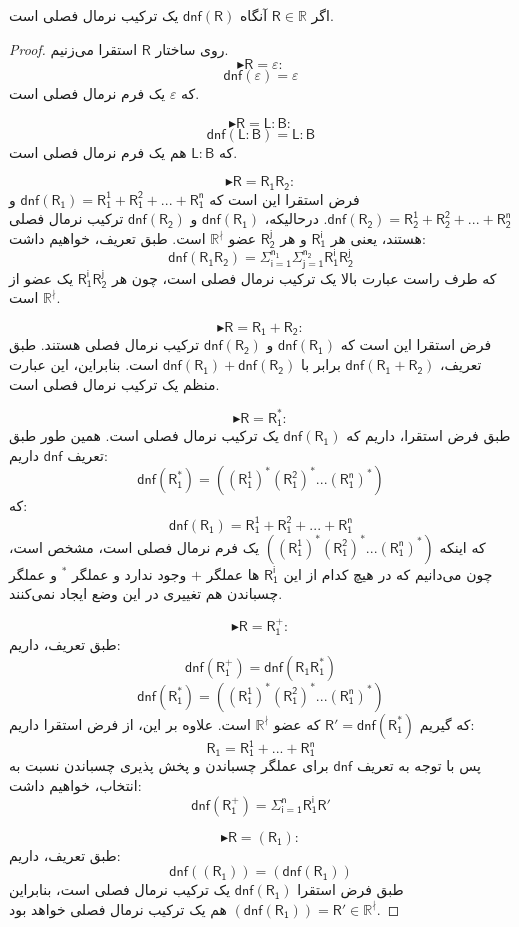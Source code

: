 \begin{thm}
	اگر $\mathsf{R} \in \mathbb{R}$ آنگاه $\mathsf{dnf(R)}$ یک ترکیب نرمال فصلی است.
\end{thm}
\begin{proof}
روی ساختار $\mathsf{R}$ استقرا می‌زنیم.
$$\blacktriangleright \mathsf{R}=\varepsilon:$$
$$\mathsf{dnf(\varepsilon)}=\varepsilon$$
که $\varepsilon$ یک فرم نرمال فصلی است.


$$\blacktriangleright \mathsf{R=L:B}:$$
$$\mathsf{dnf(\mathsf{L:B})}=\mathsf{L:B}$$
که $\mathsf{L:B}$ هم یک فرم نرمال فصلی است.


$$\blacktriangleright \mathsf{R=R_1R_2}:$$
فرض استقرا این است که 
$\mathsf{dnf(R_1)=R_1^1+R_1^2+...+R_1^n}$
و
$\mathsf{dnf(R_2)=R_2^1+R_2^2+...+R_2^n}$.
درحالیکه، $\mathsf{dnf(R_1)}$ و $\mathsf{dnf(R_2)}$ ترکیب نرمال فصلی هستند، یعنی هر $\mathsf{R_1^i}$ و هر $\mathsf{R_2^j}$ عضو $\mathbb{R^{\nmid}}$ است.
طبق تعریف، خواهیم داشت:
$$\mathsf{dnf}(\mathsf{R_1 R_2})=\mathsf{\Sigma_{i=1}^{n_1}\Sigma_{j=1}^{n_2} R_1^i R_2^j}$$
که طرف راست عبارت بالا یک ترکیب نرمال فصلی است، چون هر  
$\mathsf{R_1^i R_2^j}$
یک عضو از $\mathbb{R}^\nmid$ است.

$$\blacktriangleright \mathsf{R=R_1+R_2}:$$
فرض استقرا این است که $\mathsf{dnf(R_1)}$ و $\mathsf{dnf(R_2)}$ ترکیب نرمال فصلی هستند. طبق تعریف،
$\mathsf{dnf(R_1+R_2)}$
برابر با
$\mathsf{dnf(R_1)+dnf(R_2)}$
است. بنابراین، این عبارت منظم یک ترکیب نرمال فصلی است.

$$\blacktriangleright \mathsf{R=R_1^*}:$$
طبق فرض استقرا، داریم که $\mathsf{dnf(R_1)}$ یک ترکیب نرمال فصلی است. همین طور طبق تعریف $\mathsf{dnf}$ داریم:
$$\mathsf{dnf(R_1^*)= ((R_1^1)^* (R_1^2)^* ... (R_1^n)^*)}$$
که:
$$\mathsf{dnf(R_1)=R_1^1+R_1^2+...+R_1^n}$$
که اینکه $\mathsf{((R_1^1)^* (R_1^2)^* ... (R_1^n)^*)}$ یک فرم نرمال فصلی است، مشخص است، چون می‌دانیم که در هیچ کدام از این $\mathsf{R_1^i}$ ها عملگر $+$ وجود ندارد و عملگر $ ^*$ و عملگر چسباندن هم تغییری در این وضع ایجاد نمی‌کنند.

$$\blacktriangleright \mathsf{R=R_1^+}:$$
طبق تعریف، داریم:
$$\mathsf{dnf(R_1^+)=dnf(R_1 R_1^*)}$$
$$\mathsf{dnf(R_1^*)= ((R_1^1)^* (R_1^2)^* ... (R_1^n)^*)}$$
که گیریم 
$\mathsf{R'=dnf(R_1^*)}$
 که عضو 
 $\mathbb{R^\nmid}$
است. علاوه بر این، از فرض استقرا داریم:
$$\mathsf{R_1= R_1^1 + ... + R_1^n}$$
پس با توجه به تعریف $\mathsf{dnf}$ برای عملگر چسباندن و پخش پذیری چسباندن نسبت به انتخاب، خواهیم داشت:
$$\mathsf{dnf(R_1^+) = \Sigma_{i=1}^n R_1^i R'}$$

$$\blacktriangleright \mathsf{R=(R_1)}:$$
طبق تعریف، داریم:
$$\mathsf{dnf((R_1))=(dnf(R_1))}$$
طبق فرض استقرا 
$\mathsf{dnf(R_1)}$
یک ترکیب نرمال فصلی است، بنابراین 
$\mathsf{(dnf(R_1))=R'} \in \mathbb{R^\nmid}$ 
هم یک ترکیب نرمال فصلی خواهد بود.

\end{proof}

